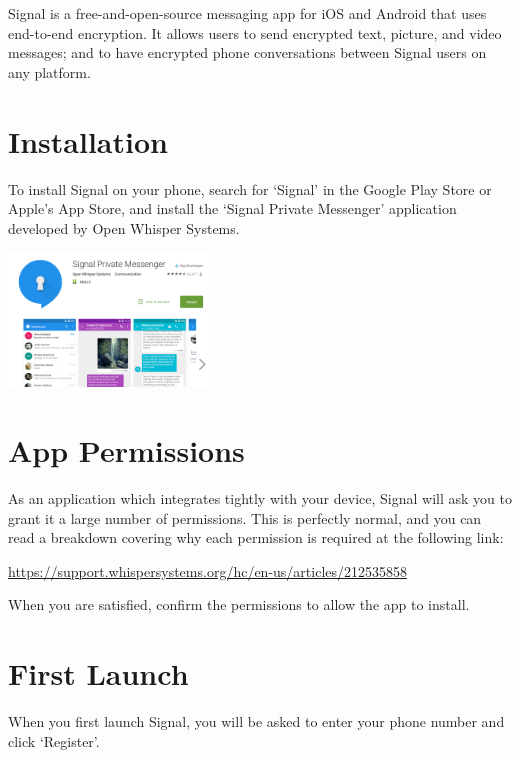 \documentclass[10.5pt,a4paper]{article} %
\begin{document}
\begin{multicols*}{2} %

Signal is a free-and-open-source messaging app for iOS and Android that uses end-to-end encryption. It allows users to send encrypted text, picture, and video messages; and to have encrypted phone conversations between Signal users on any platform.

\section*{Installation}
To install Signal on your phone, search for `Signal' in the Google Play Store or Apple's App Store, and install the `Signal Private Messenger' application developed by Open Whisper Systems.

\begin{center}
	\includegraphics[width=0.40\textwidth]{playstore.png} %
\end{center}

\section*{App Permissions}
As an application which integrates tightly with your device, Signal will ask you to grant it a large number of permissions. This is perfectly normal, and you can read a breakdown covering why each permission is required at the following link:

\begin{center}
	\url{https://support.whispersystems.org/hc/en-us/articles/212535858} %
\end{center}

When you are satisfied, confirm the permissions to allow the app to install.


\section*{First Launch}
When you first launch Signal, you will be asked to enter your phone number and click `Register'.


\end{multicols*}
\end{document}
